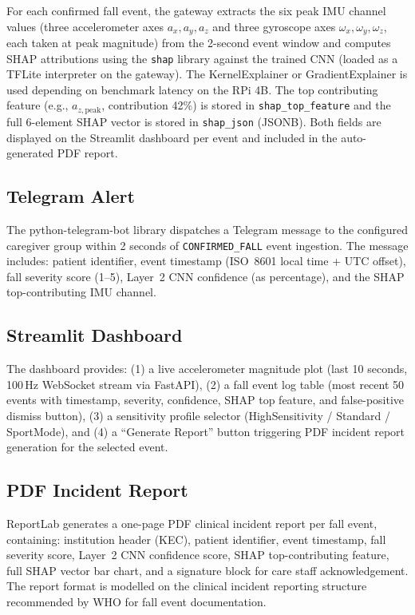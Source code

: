 For each confirmed fall event, the gateway extracts the six peak IMU channel values (three accelerometer axes $a_{x}, a_{y}, a_{z}$ and three gyroscope axes $\omega_{x}, \omega_{y}, \omega_{z}$, each taken at peak magnitude) from the 2-second event window and computes SHAP attributions using the \texttt{shap} library against the trained CNN (loaded as a TFLite interpreter on the gateway). The KernelExplainer or GradientExplainer is used depending on benchmark latency on the RPi 4B. The top contributing feature (e.g., $a_{z,\text{peak}}$, contribution 42\%) is stored in \texttt{shap\_top\_feature} and the full 6-element SHAP vector is stored in \texttt{shap\_json} (JSONB). Both fields are displayed on the Streamlit dashboard per event and included in the auto-generated PDF report.

\subsection{Telegram Alert}

The python-telegram-bot library dispatches a Telegram message to the configured caregiver group within 2 seconds of \texttt{CONFIRMED\_FALL} event ingestion. The message includes: patient identifier, event timestamp (ISO~8601 local time + UTC offset), fall severity score (1--5), Layer~2 CNN confidence (as percentage), and the SHAP top-contributing IMU channel.

\subsection{Streamlit Dashboard}

The dashboard provides: (1) a live accelerometer magnitude plot (last 10 seconds, 100\,Hz WebSocket stream via FastAPI), (2) a fall event log table (most recent 50 events with timestamp, severity, confidence, SHAP top feature, and false-positive dismiss button), (3) a sensitivity profile selector (HighSensitivity / Standard / SportMode), and (4) a ``Generate Report'' button triggering PDF incident report generation for the selected event.

\subsection{PDF Incident Report}

ReportLab generates a one-page PDF clinical incident report per fall event, containing: institution header (KEC), patient identifier, event timestamp, fall severity score, Layer~2 CNN confidence score, SHAP top-contributing feature, full SHAP vector bar chart, and a signature block for care staff acknowledgement. The report format is modelled on the clinical incident reporting structure recommended by WHO \cite{who2007falls} for fall event documentation.

